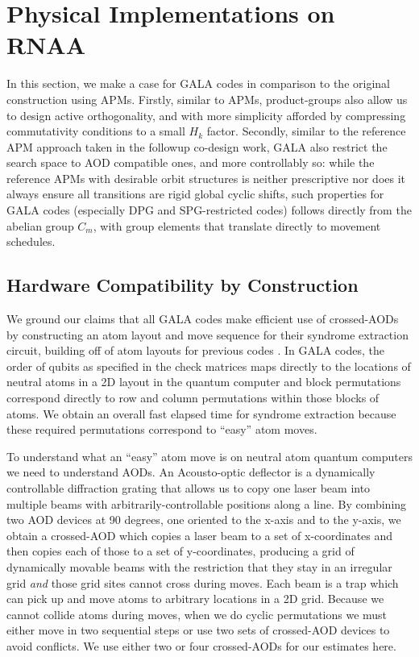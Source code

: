 \section{Physical Implementations on RNAA}\label{sec:hardware}
In this section, we make a case for GALA codes in comparison to the original construction using APMs. Firstly, similar to APMs, product-groups also allow us to design active orthogonality, and with more simplicity afforded by compressing commutativity conditions to a small $H_k$ factor. Secondly, similar to the reference APM approach taken in the followup co-design work, GALA also restrict the search space to AOD compatible ones, and more controllably so: while the reference APMs with desirable orbit structures is neither prescriptive nor does it always ensure all transitions are rigid global cyclic shifts, such properties for GALA codes (especially DPG and SPG-restricted codes) follows directly from the abelian group $C_m$, with group elements that translate directly to movement schedules. 


\subsection{Hardware Compatibility by Construction}\label{ssec:matching-hardware}

 We ground our claims that all GALA codes make efficient use of crossed-AODs by constructing an atom layout and move sequence for their syndrome extraction circuit, building off of atom layouts for previous codes \cite{zhao2026ultrahighratequantumerrorcorrection}. In GALA codes, the order of qubits as specified in the check matrices maps directly to the locations of neutral atoms in a 2D layout in the quantum computer and block permutations correspond directly to row and column permutations within those blocks of atoms. We obtain an overall fast elapsed time for syndrome extraction because these required permutations correspond to ``easy'' atom moves.

To understand what an ``easy'' atom move is on neutral atom quantum computers we need to understand AODs. An Acousto-optic deflector is a dynamically controllable diffraction grating that allows us to copy one laser beam into multiple beams with arbitrarily-controllable positions along a line. By combining two AOD devices at 90 degrees, one oriented to the x-axis and to the y-axis, we obtain a crossed-AOD which copies a laser beam to a set of x-coordinates and then copies each of those to a set of y-coordinates, producing a grid of dynamically movable beams with the restriction that they stay in an irregular grid \textit{and} those grid sites cannot cross during moves. Each beam is a trap which can pick up and move atoms to arbitrary locations in a 2D grid. Because we cannot collide atoms during moves, when we do cyclic permutations we must either move in two sequential steps or use two sets of crossed-AOD devices to avoid conflicts. We use either two or four crossed-AODs for our estimates here.


